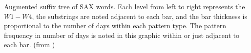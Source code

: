 Augmented suffix tree of SAX words. Each level from left to right represents the $W1-W4$, the substrings are noted adjacent to each bar, and the bar thickness is proportional to the number of days within each pattern type. The pattern frequency in number of days is noted in this graphic within or just adjacent to each bar. (from \cite{miller_automated_2015})
\label{fig:saxdiscordsankey}